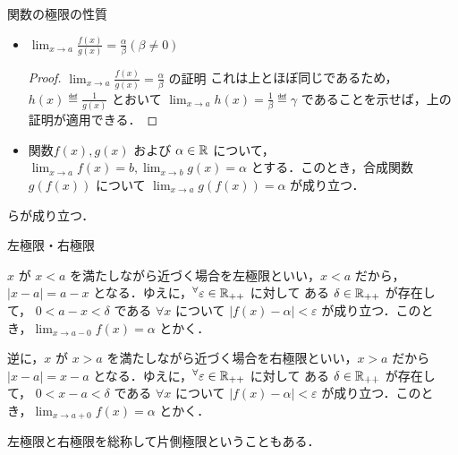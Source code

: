 \documentclass[xelatex,ja=standard,jafont=noto]{bxjsarticle}
\begin{document}
\begin{theorem}{関数の極限の性質}{}
\begin{itemize}
\begin{proof}{$\displaystyle \lim_{x \to a} f(x)g(x) = \alpha\beta$ の証明}{}
        このとき，正の実数 $M = \max\{|\alpha - \varepsilon_1|, |\alpha + \varepsilon_1|\}$ ととると，$f(x) < M$ である．
        $\delta = \min\{\delta_1, \delta_2\}$ とすると，三角不等式より $|f(x)g(x) - \alpha\beta| = |f(x)(g(x) - \beta) + \beta(f(x) - \alpha)| \leq |f(x)(g(x) - \beta)| + |\beta(f(x) - \alpha)| = |\alpha|\varepsilon_2 + |\beta|\varepsilon_1 < M\varepsilon_2 + |\beta|\varepsilon_1$ である．
        $\varepsilon \eqdef M\varepsilon_2 + |\beta|\varepsilon_1$ と改めておく（$\varepsilon_1 と \varepsilon_2$ が正の実数だから $\varepsilon$ も正）．
        ゆえに $\displaystyle \lim_{x \to a} f(x)g(x) = \alpha\beta$ が示された．
      \end{proof}
      \item $\displaystyle \lim_{x \to a} \frac{f(x)}{g(x)} = \frac{\alpha}{\beta} (\beta \neq 0)$
      \begin{proof}{$\displaystyle \lim_{x \to a} \frac{f(x)}{g(x)} = \frac{\alpha}{\beta}$ の証明}{}
        これは上とほぼ同じであるため，$h(x) \eqdef \frac{1}{g(x)}$ とおいて $\lim_{x \to a} h(x) = \frac{1}{\beta} \eqdef \gamma$ であることを示せば，上の証明が適用できる．
      \end{proof}
      \item 関数$f(x), g(x)$ および $\alpha \in \mathbb{R}$ について，$\lim_{x \to a} f(x) = b, \lim_{x \to b} g(x) = \alpha$ とする．このとき，合成関数 $g(f(x))$ について $\lim_{x \to a}g(f(x)) = \alpha$ が成り立つ．
    \end{itemize}

    らが成り立つ．
  \end{theorem}
  
  \begin{tcb}{左極限・右極限}{}
  
  $x$ が $x < a$ を満たしながら近づく場合を左極限といい，$x < a$ だから，$|x - a| = a - x$ となる．ゆえに，$\forall \varepsilon \in \R_{++}$ に対して ある $\delta \in \mathbb{R}_{++}$ が存在して， 
  $0 < a - x < \delta$ である $\forall x$ について $|f(x) - \alpha| < \varepsilon$ が成り立つ．このとき，$\displaystyle \lim_{x \to a-0} f(x) = \alpha$ とかく．

  逆に，$x$ が $x > a$ を満たしながら近づく場合を右極限といい，$x > a$ だから $|x - a| = x - a$ となる．ゆえに，$\forall \varepsilon \in \R_{++}$ に対して ある $\delta \in \mathbb{R}_{++}$ が存在して， 
  $0 < x - a < \delta$ である $\forall x$ について $|f(x) - \alpha| < \varepsilon$ が成り立つ．このとき，$\displaystyle \lim_{x \to a+0} f(x) = \alpha$ とかく．

  左極限と右極限を総称して片側極限ということもある．
  \end{tcb}
\end{document}
